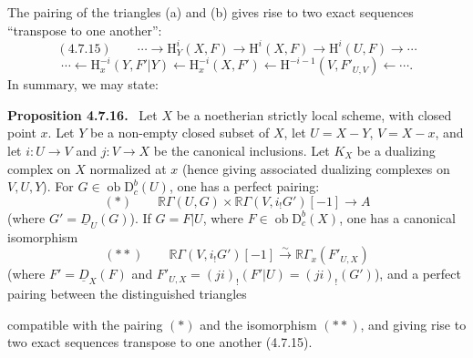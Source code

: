 \documentclass[11pt]{article}
\newenvironment{statement}[1]{\par\medskip\noindent\textbf{#1.}\ }{\par\medskip}
\renewcommand{\H}{\mathrm{H}}
\newcommand{\D}{\mathrm{D}}
\newcommand{\ob}{\operatorname{ob}}
\providecommand{\ob}{\operatorname{ob}}
\begin{document}
The pairing of the triangles (a) and (b) gives rise to two exact sequences ``transpose to one another'':
\[
(4.7.15)\qquad \cdots\longrightarrow \H_Y^i(X,F)\longrightarrow\H^i(X,F)\longrightarrow\H^i(U,F)\longrightarrow\cdots
\]
\[
\cdots\longleftarrow \H_x^{-i}(Y,F'|Y)\longleftarrow\H_x^{-i}(X,F')\longleftarrow\H^{-i-1}(V,F'_{U,V})\longleftarrow\cdots.
\]
In summary, we may state:

\begin{statement}{Proposition 4.7.16}
Let $X$ be a noetherian strictly local scheme, with closed point $x$. Let $Y$ be a non-empty closed subset of $X$, let $U=X-Y$, $V=X-x$, and let $i:U\to V$ and $j:V\to X$ be the canonical inclusions. Let $K_X$ be a dualizing complex on $X$ normalized at $x$ (hence giving associated dualizing complexes on $V,U,Y$). For $G\in\ob\D_c^b(U)$, one has a perfect pairing:
\[
(*)\qquad \mathbb{R}\Gamma(U,G)\times\mathbb{R}\Gamma(V,i_!G')[-1]\longrightarrow A
\]
(where $G'=\underline{D}_U(G)$). If $G=F|U$, where $F\in\ob\D_c^b(X)$, one has a canonical isomorphism
\[
(**)\qquad \mathbb{R}\Gamma(V,i_!G')[-1]\xrightarrow{\sim}\mathbb{R}\Gamma_x(F'_{U,X})
\]
(where $F'=\underline{D}_X(F)$ and $F'_{U,X}=(ji)_!(F'|U)=(ji)_!(G')$), and a perfect pairing between the distinguished triangles
\begin{center}
\end{center}
compatible with the pairing $(*)$ and the isomorphism $(**)$, and giving rise to two exact sequences transpose to one another (4.7.15).
\end{statement}
\end{document}
